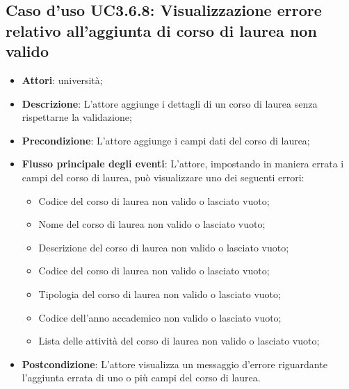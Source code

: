\subsection{Caso d'uso \texorpdfstring{UC3.6.8}{UC3.6.8}: Visualizzazione errore relativo all’aggiunta di corso di laurea non valido }
\begin{itemize}
\item \textbf{Attori}: università;
\item \textbf{Descrizione}: L'attore aggiunge i dettagli di un corso di laurea senza rispettarne la validazione;

\item \textbf{Precondizione}: L'attore aggiunge i campi dati del corso di laurea;

\item \textbf{Flusso principale degli eventi}: L'attore, impostando in maniera errata i campi del corso di laurea, può visualizzare uno dei seguenti errori: \begin{itemize}
\item Codice del corso di laurea non valido o lasciato vuoto;
\item Nome del corso di laurea non valido o lasciato vuoto;
\item Descrizione del corso di laurea non valido o lasciato vuoto;
\item Codice del corso di laurea non valido o lasciato vuoto;
\item Tipologia del corso di laurea non valido o lasciato vuoto;
\item Codice dell'anno accademico non valido o lasciato vuoto;
\item Lista delle attività del corso di laurea non valido o lasciato vuoto;
\end{itemize}

\item \textbf{Postcondizione}: L'attore visualizza un messaggio d'errore riguardante l'aggiunta errata di uno o più campi del corso di laurea.

\end{itemize}
